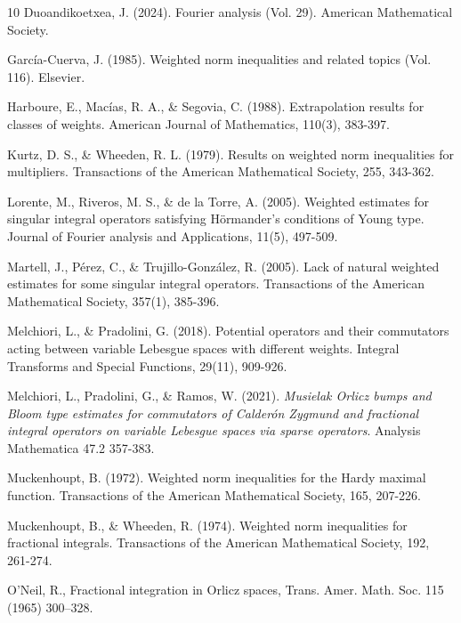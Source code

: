 \documentclass[a4paper,11pt,reqno]{amsart}
\theoremstyle{plain}
\numberwithin{equation}{section}
\theoremstyle{definition}
\begin{document}
\begin{thebibliography}{10}
{Duoandikoetxea, J. (2024). Fourier analysis (Vol. 29). American Mathematical Society.
}

{García-Cuerva, J. (1985). Weighted norm inequalities and related topics (Vol. 116). Elsevier.
}

{Harboure, E., Macías, R. A., \& Segovia, C. (1988). Extrapolation results for classes of weights. American Journal of Mathematics, 110(3), 383-397.
}

{Kurtz, D. S., \& Wheeden, R. L. (1979). Results on weighted norm inequalities for multipliers. Transactions of the American Mathematical Society, 255, 343-362.
}

{Lorente, M., Riveros, M. S., \& de la Torre, A. (2005). Weighted estimates for singular integral operators satisfying Hörmander’s conditions of Young type. Journal of Fourier analysis and Applications, 11(5), 497-509.
}

{Martell, J., Pérez, C., \& Trujillo-González, R. (2005). Lack of natural weighted estimates for some singular integral operators. Transactions of the American Mathematical Society, 357(1), 385-396.
}

{Melchiori, L., \& Pradolini, G. (2018). Potential operators and their commutators acting between variable Lebesgue spaces with different weights. Integral Transforms and Special Functions, 29(11), 909-926.
	
}

{Melchiori, L., Pradolini, G., \& Ramos, W. (2021). {\it Musielak Orlicz bumps and Bloom type estimates for commutators of Calder\'on Zygmund and fractional integral operators on variable Lebesgue spaces via sparse operators}. Analysis Mathematica 47.2  357-383.
}

{Muckenhoupt, B. (1972). Weighted norm inequalities for the Hardy maximal function. Transactions of the American Mathematical Society, 165, 207-226.
	
}

{Muckenhoupt, B., \& Wheeden, R. (1974). Weighted norm inequalities for fractional integrals. Transactions of the American Mathematical Society, 192, 261-274.
}

{O'Neil, R., Fractional integration in Orlicz spaces, Trans. Amer. Math. Soc. 115 (1965) 300–328.
}
\end{thebibliography}
\end{document}
